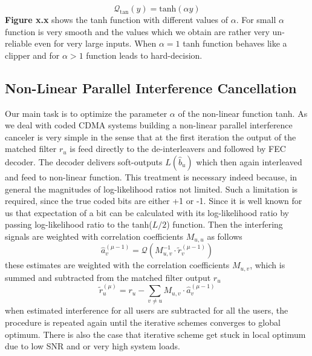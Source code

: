 \begin{equation}
\mathcal{Q}_{\mathrm{tan}}(y)=\mathrm{tanh}(\alpha y)
\end{equation}
\textbf{Figure x.x} shows the tanh function with different values of $\alpha$. For small $\alpha$ function is very smooth and the values which we obtain are rather very un-reliable even for very large inputs. When $\alpha=1$ tanh function behaves like a clipper and for $\alpha>1$ function leads to hard-decision.
\subsection{Non-Linear Parallel Interference Cancellation}
Our main task is to optimize the parameter $\alpha$ of the non-linear function tanh. As we deal with coded CDMA systems building a non-linear parallel interference canceler is very simple in the sense that at the first iteration the output of the matched filter $r_u$ is feed directly to the de-interleavers and followed by FEC decoder. The decoder delivers soft-outputs $L(\hat{b}_u)$ which then again interleaved and feed to non-linear function. This treatment is necessary indeed because, in general the magnitudes of log-likelihood ratios not limited. Such a limitation is required, since the true coded bits are either +1 or -1. Since it is well known for us that expectation of a bit can be calculated with its log-likelihood ratio by passing log-likelihood ratio to the tanh($L/2$) function. Then the interfering signals are weighted with correlation coefficients $M_{u,u}$ as follows
\begin{equation}
\hat{a}_v^{(\mu-1)}=\mathcal{Q}\left(M_{u,v}^{-1}\cdot \tilde{r}_v^{(\mu-1)}\right)
\end{equation}
these estimates are weighted with the correlation coefficients $M_{u,v}$, which is summed and subtracted from the matched filter output $r_u$
\begin{equation}
\tilde{r}_u^{(\mu)}=r_u-\sum\limits_{v\ne u}M_{u,v}\cdot \hat{a}_v^{(\mu-1)}
\end{equation}
when estimated interference for all users are subtracted for all the users, the procedure is repeated again until the iterative schemes converges to global optimum. There is also the case that iterative scheme get stuck in local optimum due to low SNR and or very high system loads.
